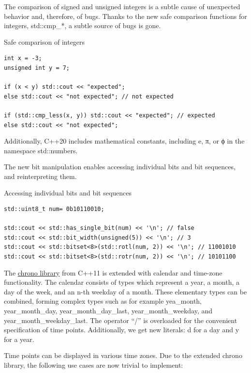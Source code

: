 
The comparison of signed and unsigned integers is a subtle cause of unexpected behavior and, therefore, of bugs. Thanks to the new safe comparison functions for integers, std::cmp\_*, a subtle source of bugs is gone.

\noindent
Safe comparison of integers
\begin{lstlisting}[style=styleCXX]
int x = -3;
unsigned int y = 7;

if (x < y) std::cout << "expected";
else std::cout << "not expected"; // not expected

if (std::cmp_less(x, y)) std::cout << "expected"; // expected
else std::cout << "not expected";
\end{lstlisting}

Additionally, C++20 includes mathematical constants, including e, π, or ϕ in the namespace std::numbers.

The new bit manipulation enables accessing individual bits and bit sequences, and reinterpreting them.

\noindent
Accessing individual bits and bit sequences
\begin{lstlisting}[style=styleCXX]
std::uint8_t num= 0b10110010;

std::cout << std::has_single_bit(num) << '\n'; // false
std::cout << std::bit_width(unsigned(5)) << '\n'; // 3
std::cout << std::bitset<8>(std::rotl(num, 2)) << '\n'; // 11001010
std::cout << std::bitset<8>(std::rotr(num, 2)) << '\n'; // 10101100
\end{lstlisting}


The \href{https://en.cppreference.com/w/cpp/chrono}{chrono library} from C++11 is extended with calendar and time-zone functionality. The calendar consists of types which represent a year, a month, a day of the week, and an n-th weekday of a month. These elementary types can be combined, forming complex types such as for example yea\_month, year\_month\_day, year\_month\_day\_last, year\_month\_weekday, and year\_month\_weekday\_last. The operator “/” is overloaded for the convenient specification of time points. Additionally, we get new literals: d for a day and y for a year.

Time points can be displayed in various time zones. Due to the extended chrono library, the following use cases are now trivial to implement:

